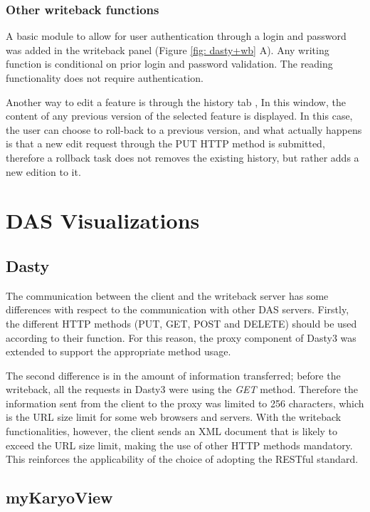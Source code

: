 \subsubsection{Other writeback functions}
A basic module to allow for user authentication through a login and password was added in the writeback panel (Figure \ref{fig: dasty+wb} A). Any writing function is conditional on prior login and password validation. The reading functionality does not require authentication.

Another way to edit a feature is through the history tab , In this window, the content of any previous version of the selected feature is displayed. In this case, the user can choose to roll-back to a previous version, and what actually happens is that a new edit request through the PUT HTTP method is submitted, therefore a rollback task does not removes the existing history, but rather adds a new edition to it.




	
\section{DAS Visualizations} \label{section:dasvisual}
\subsection{Dasty} \label{section:dasty}
The communication between the client and the writeback server has some differences with respect to the communication with other DAS servers. Firstly, the different HTTP methods (PUT, GET, POST and DELETE) should be used according to their function. For this reason, the proxy component of Dasty3 was extended to support the appropriate method usage. 

The second difference is in the amount of information transferred; before the writeback, all the requests in Dasty3 were using the \emph{GET} method. Therefore the information sent from the client to the proxy was limited to 256 characters, which is the URL size limit for some web browsers and servers. With the writeback functionalities, however, the client sends an XML document that is likely to exceed the URL size limit, making the use of other HTTP methods mandatory. This reinforces the applicability of the choice of adopting the RESTful standard. 

\subsection{myKaryoView}\label{section:mykarioview}
